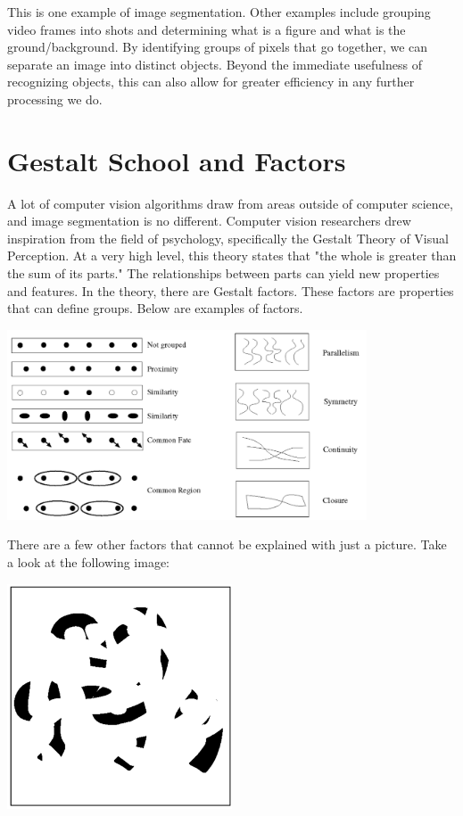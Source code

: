 \documentclass{article}
\begin{document}
This is one example of image segmentation. Other examples include grouping video frames into shots and determining what is a figure and what is the ground/background. By identifying groups of pixels that go together, we can separate an image into distinct objects. Beyond the immediate usefulness of recognizing objects, this can also allow for greater efficiency in any further processing we do.


\section{Gestalt School and Factors}
A lot of computer vision algorithms draw from areas outside of computer science, and image segmentation is no different. Computer vision researchers drew inspiration from the field of psychology, specifically the Gestalt Theory of Visual Perception. At a very high level, this theory states that "the whole is greater than the sum of its parts." The relationships between parts can yield new properties and features. In the theory, there are Gestalt factors. These factors are properties that can define groups. Below are examples of factors.

\begin{center}
\includegraphics[width=0.8\textwidth]{gestalt-factors.png}
\end{center}

There are a few other factors that cannot be explained with just a picture. Take a look at the following image:

\begin{center}
\centering
\includegraphics[width=0.5\textwidth]{continuity-occlusion.png}
\end{center}
\end{document}
